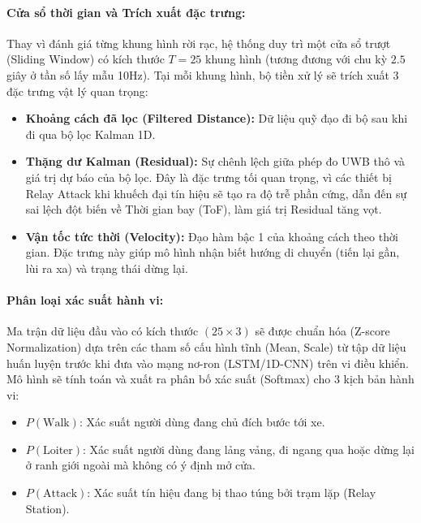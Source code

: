 \paragraph*{Cửa sổ thời gian và Trích xuất đặc trưng: }
Thay vì đánh giá từng khung hình rời rạc, hệ thống duy trì một cửa sổ trượt (Sliding Window) có kích thước $T = 25$ khung hình (tương đương với chu kỳ $2.5$ giây ở tần số lấy mẫu 10Hz). Tại mỗi khung hình, bộ tiền xử lý sẽ trích xuất 3 đặc trưng vật lý quan trọng:
\begin{itemize}
    \item \textbf{Khoảng cách đã lọc (Filtered Distance):} Dữ liệu quỹ đạo đi bộ sau khi đi qua bộ lọc Kalman 1D.
    \item \textbf{Thặng dư Kalman (Residual):} Sự chênh lệch giữa phép đo UWB thô và giá trị dự báo của bộ lọc. Đây là đặc trưng tối quan trọng, vì các thiết bị Relay Attack khi khuếch đại tín hiệu sẽ tạo ra độ trễ phần cứng, dẫn đến sự sai lệch đột biến về Thời gian bay (ToF), làm giá trị Residual tăng vọt.
    \item \textbf{Vận tốc tức thời (Velocity):} Đạo hàm bậc 1 của khoảng cách theo thời gian. Đặc trưng này giúp mô hình nhận biết hướng di chuyển (tiến lại gần, lùi ra xa) và trạng thái dừng lại.
\end{itemize}

\paragraph*{Phân loại xác suất hành vi: }
Ma trận dữ liệu đầu vào có kích thước $(25 \times 3)$ sẽ được chuẩn hóa (Z-score Normalization) dựa trên các tham số cấu hình tĩnh (Mean, Scale) từ tập dữ liệu huấn luyện trước khi đưa vào mạng nơ-ron (LSTM/1D-CNN) trên vi điều khiển.
Mô hình sẽ tính toán và xuất ra phân bố xác suất (Softmax) cho 3 kịch bản hành vi:
\begin{itemize}
    \item $P(\text{Walk})$: Xác suất người dùng đang chủ đích bước tới xe.
    \item $P(\text{Loiter})$: Xác suất người dùng đang lảng vảng, đi ngang qua hoặc dừng lại ở ranh giới ngoài mà không có ý định mở cửa.
    \item $P(\text{Attack})$: Xác suất tín hiệu đang bị thao túng bởi trạm lặp (Relay Station).
\end{itemize}

